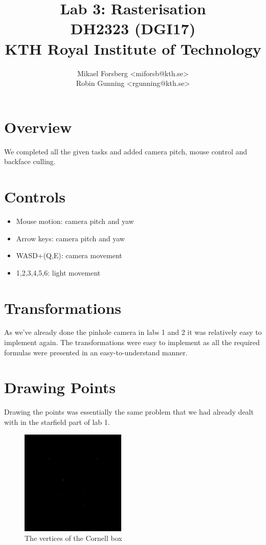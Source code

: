 \documentclass[a4paper,11pt]{article}
\begin{document}
\title{\vspace{-2cm} Lab 3: Rasterisation\\ \small DH2323 (DGI17)\\ KTH Royal Institute of Technology}
\author{Mikael Forsberg <miforsb@kth.se>\\ Robin Gunning <rgunning@kth.se>}
\maketitle

\vspace{-1.25cm}

\section*{Overview}
We completed all the given tasks and added camera pitch, mouse control and backface culling.

\section*{Controls}
\begin{itemize}
\item Mouse motion: camera pitch and yaw
\item Arrow keys: camera pitch and yaw
\item WASD+(Q,E): camera movement
\item 1,2,3,4,5,6: light movement
\end{itemize}

\section*{Transformations}
As we've already done the pinhole camera in labs 1 and 2 it was relatively easy to implement again.
The transformations were easy to implement as all the required formulas were presented in an easy-to-understand
manner. 

\section*{Drawing Points}
Drawing the points was essentially the same problem that we had already dealt with in the
starfield part of lab 1.

\begin{figure}[H]
\begin{center}
\includegraphics[width=5cm]{dots.jpg}
\caption{The vertices of the Cornell box}
\end{center}
\end{figure}
\vspace{-1.5cm}
\end{document}
